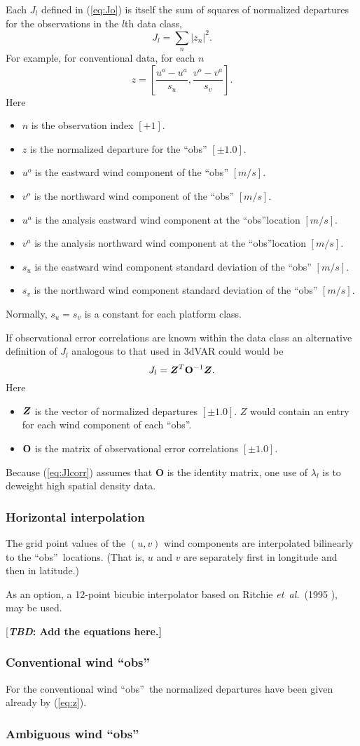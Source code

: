 \documentclass[11pt]{article}
\newcommand{\etal}{{\em et~al.}}
\newcommand{\gl}[1]{\mbox{$ \lambda_{#1} $}}
\newcommand{\J}[1]{\mbox{$ J_{#1} $}}
\newcommand{\Matrix}[1]{{\bf {#1}}}
\newcommand{\obs}{``obs''}
\newcommand{\Vector}[1]{\mbox{\boldmath ${#1}$}}
\newcommand{\xxxx}[1]{\subsubsection {#1}}
\newcommand{\TBD}[1]{{[\bfseries{\itshape{TBD: }{{#1}}}]}}
\newcommand{\reference}[2]{(#1 \cite{#2})}
\newcommand{\eql}[2]{\begin{equation} \label{eq:#1} #2 \end{equation}}
\newcommand{\eqr}[1]{(\ref{eq:#1})}
\newcommand{\COMMENT}[2]{{[\bfseries {\itshape #1}: {#2}]}}
\renewcommand{\TBD}[1]{\COMMENT{TBD}{{#1}}}
\newcommand{\vardef}[3]{\item $ {#1} $ is the {#2} $ [{#3}] $. }
\begin{document}
Each \J{l} defined in \eqr{Jo} is itself the sum of squares of
normalized departures for the observations in the $l$th data class,
 \eql{Jl}{ J_l = \sum_n |z_n|^2 . }
 For example, for conventional data, for each $n$
 \eql{z}{ z = \left[\frac{u^o - u^a}{s_u} ,
                  \frac{v^o - v^a}{s_v}\right] . }
 Here \begin{itemize}
  \vardef{n}{observation index}{+1}
  \vardef{z}{normalized departure for the \obs}{\pm 1.0}
  \vardef{u^o}{eastward wind component of the \obs}{m/s}
  \vardef{v^o}{northward wind component of the \obs}{m/s}
  \vardef{u^a}{analysis eastward wind component at the \obs location}{m/s}
  \vardef{v^a}{analysis northward wind component at the \obs location}{m/s}
  \vardef{s_u}{eastward wind component standard deviation of the \obs}{m/s}
  \vardef{s_v}{northward wind component standard deviation of the \obs}{m/s}
 \end{itemize}
 Normally, $ s_u = s_v $ is a constant for each platform class.

If observational error correlations are known within the data class
an alternative definition of \J{l} analogous to that used in 3dVAR
could would be
 \eql{Jlcorr}{ J_l = \Vector{Z}^T \Matrix{O}^{-1} \Vector{Z}.}
 Here \begin{itemize}
  \vardef{\Vector{Z}}{vector of normalized departures}{\pm 1.0}
   \Vector{Z} would contain an entry for each wind component of each \obs.
  \vardef{\Matrix{O}}{matrix of observational error correlations}{\pm 1.0}
 \end{itemize} 
 Because \eqr{Jlcorr} assumes that \Matrix{O} is the identity matrix, one
use of \gl{l} is to deweight high spatial density data.

\xxxx {Horizontal interpolation}

The grid point values of the $(u,v)$ wind components are interpolated
bilinearly to the \obs\ locations.  (That is, $u$ and $v$ are
separately first in longitude and then in latitude.)

As an option, a 12-point bicubic interpolator based on Ritchie \etal\
\reference{1995}{RitTS+95}, may be used.

\TBD{Add the equations here.}

\xxxx {Conventional wind \obs}

For the conventional wind \obs\ the normalized departures have been
given already by \eqr{z}.

\xxxx {Ambiguous wind \obs}
\end{document}
